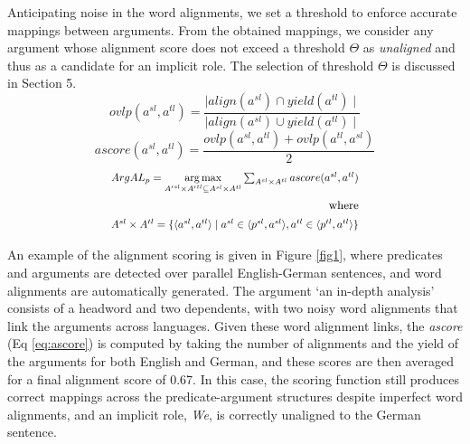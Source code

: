 \documentclass[11pt]{article}
\newcommand*{\Scale}[2][4]{\scalebox{#1}{$#2$}}%
\begin{document}
Anticipating noise in the word alignments, we set a threshold to enforce accurate mappings between arguments. From the obtained mappings, we consider any argument whose alignment score does not exceed a threshold $\Theta$ as {\em unaligned} and thus as a candidate for an implicit role. The selection of threshold $\Theta$ is discussed in Section 5.
\begin{equation}
{ovlp(a^{sl},a^{tl}) = \frac{\mid align(a^{sl}) \cap yield(a^{tl})\mid}{\mid align(a^{sl}) \cup yield(a^{tl})\mid}}
\label{eq:jacc}
\end{equation}
 \vspace*{-2mm}
\begin{equation}
{ascore(a^{sl},a^{tl})=\frac{ovlp(a^{sl},a^{tl})+ ovlp(a^{tl},a^{sl})}{2}}
\label{eq:ascore}
\end{equation}
 \vspace*{-5mm}
\begin{align}\label{eq:maxsumofscores}
\begin{split}
\Scale[0.85]
{{ArgAL_p} = \underset{{A'}^{sl}\times {A'}^{tl} \subseteq  A^{sl} \times A^{tl}} {\operatorname*{arg\,max}} \sum_{A^{sl} \times A^{tl}} ascore(a^{sl},a^{tl}) }\\
\mbox{\small where}\\
\Scale[0.85]{A^{sl}\times A^{tl} =\{\langle a^{sl},a^{tl}\rangle \mid a^{sl} \in \langle p^{sl},a^{sl} \rangle, a^{tl} \in \langle p^{tl},a^{tl}\rangle\}}
\end{split}
\end{align}
 \vspace*{-5mm}

 An example of the alignment scoring is given in Figure \ref{fig1}, where predicates and arguments are detected over parallel English-German sentences, and word alignments are automatically generated. The argument `an in-depth analysis' consists of a headword and two dependents, with two noisy word alignments that link the arguments across languages. Given these word alignment links, the {\em ascore} (Eq \ref{eq:ascore}) is computed by taking the number of alignments and the yield of the arguments for both English and German, and these scores are then averaged for a final alignment score of 0.67. In this case, the scoring function still produces correct mappings across the predicate-argument structures despite imperfect word alignments, and an implicit role, \textit{We}, is correctly unaligned to the German sentence.
\end{document}
